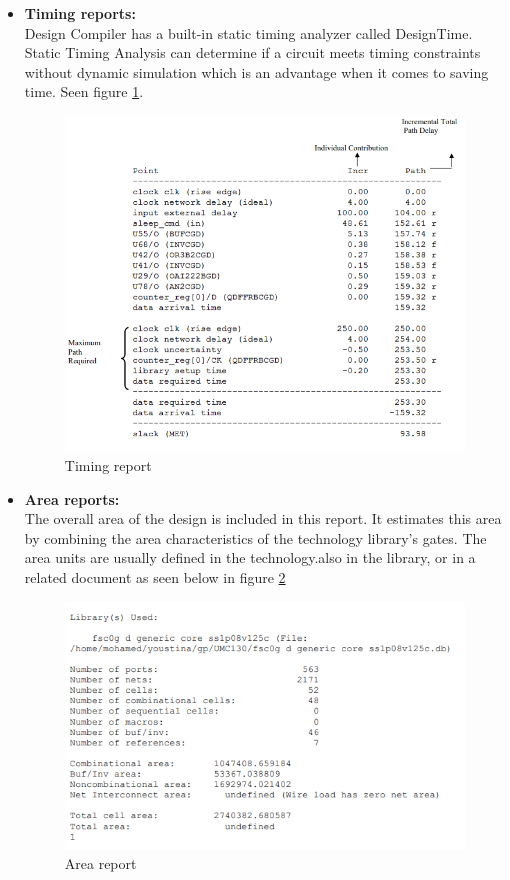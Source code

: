 \documentclass[../main.tex]{subfiles}
\begin{document}
\begin{itemize}
\item \textbf{Timing reports:}\\
Design Compiler has a built-in static timing analyzer called DesignTime. Static Timing Analysis 
can determine if a circuit meets timing constraints without dynamic simulation which is an advantage when it comes to saving time. Seen figure \ref{fig:timing_report}.

\begin{figure}[h!]
    \centering
    \includegraphics[scale = 0.75]{diagrams/timing_report.PNG}
    \caption{Timing report}
    \label{fig:timing_report}
\end{figure}

\item \textbf{Area reports:}\\
The overall area of the design is included in this report. It estimates this area by combining the area characteristics of the technology library's gates. The area units are usually defined in the technology.also in the library, or in a related document as seen below in figure \ref{fig:area_report}

\begin{figure}[h!]
    \centering
    \includegraphics[scale = 0.75]{diagrams/area_report.PNG}
    \caption{Area report}
    \label{fig:area_report}
\end{figure}
\end{itemize}
\end{document}
